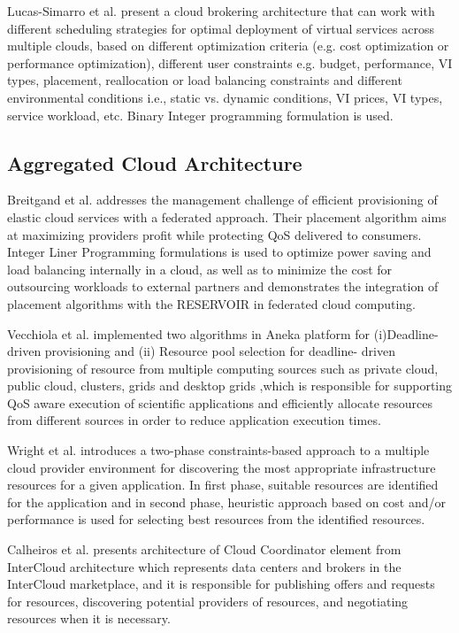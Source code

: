\documentclass[conference]{IEEEtran}
\begin{document}
Lucas-Simarro et al. \cite{lucas2012scheduling} present a cloud brokering architecture that can work with different scheduling strategies for optimal deployment of virtual services across multiple clouds, based on different optimization criteria (e.g. cost optimization or performance optimization), different user constraints e.g. budget, performance, VI types, placement, reallocation or load balancing constraints and different environmental conditions i.e., static vs. dynamic conditions, VI prices, VI types, service workload, etc. Binary Integer programming formulation is used.
\subsection{Aggregated Cloud Architecture}

Breitgand et al. \cite{breitgand2011policy} addresses the management challenge of efficient provisioning of elastic cloud services with a federated approach. Their placement algorithm aims at maximizing providers profit while protecting QoS delivered to consumers. Integer Liner Programming formulations is used to optimize power saving and load balancing internally in a cloud, as well as to minimize the cost for outsourcing workloads to external partners and demonstrates the integration of placement algorithms with the RESERVOIR \cite{rochwerger2009reservoir}in federated cloud computing. 


Vecchiola et al. \cite{vecchiola2012deadline} implemented two algorithms in Aneka platform\cite{vecchiola2009aneka} for (i)Deadline-driven provisioning and (ii) Resource pool selection for deadline- driven provisioning of resource from multiple computing sources such as private cloud, public cloud, clusters, grids and desktop grids ,which is responsible for supporting QoS aware execution of scientific applications and efficiently allocate resources from different sources in order to reduce application execution times.

Wright et al. \cite{wright2012constraints} introduces a two-phase constraints-based approach to a multiple cloud provider environment for discovering the most appropriate infrastructure resources for a given application. In first phase, suitable resources are identified for the application and in second phase, heuristic approach based on cost and/or performance is used for selecting best resources from the identified resources.

Calheiros et al. \cite{calheiros2012coordinator} presents architecture of Cloud Coordinator element from InterCloud \cite{buyya2010intercloud} architecture which represents data centers and brokers in the InterCloud marketplace, and it is responsible for publishing offers and requests for resources, discovering potential providers of resources, and negotiating resources when it is necessary. 
\end{document}
